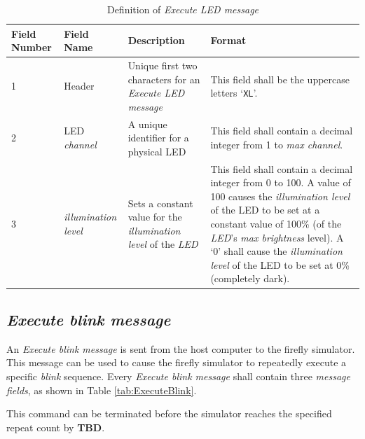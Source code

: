 \documentclass[letterpaper,11pt]{article}
\begin{document}
\begin{table}[H]
  \caption{Definition of \textit{Execute LED message}}
  \centering
  \setlength\extrarowheight{2pt}
  \begin{tabular}[h]{|p{0.5in}|p{1.00in}|p{2.25in}|p{2.25in}|} \hline
    Field Number & Field Name & Description & Format \\ \hline
    1            & Header
                 & Unique first two characters for an \textit{Execute LED
                 message}
                 & This field shall be the uppercase letters `\texttt{XL}'.
                 \\ \hline
    2            & LED \textit{channel}
                 & A unique identifier for a physical LED
                 & This field shall contain a decimal integer from 1 to
                 \textit{max channel}.
                 \\ \hline
    3            & \textit{illumination level}
                 & Sets a constant value for the \textit{illumination level}
                 of the \textit{LED}
                 & This field shall contain a decimal integer from 0 to 100.
                 A value of 100 causes the \textit{illumination level} of the
                 LED to be set at a constant value of 100\% (of the
                 \textit{LED}'s \textit{max brightness} level). A `0' shall
                 cause the \textit{illumination level} of the LED to be set at
                 0\% (completely dark).
                 \\ \hline
  \end{tabular}
  \label{tab:ExecuteLED}
\end{table}

\subsection{\textit{Execute blink message}}

An \textit{Execute blink message} is sent from the host computer to the
firefly simulator. This message can be used to cause the firefly simulator to
repeatedly execute a specific \textit{blink} sequence. Every \textit{Execute
blink message} shall contain three \textit{message fields}, as shown in Table
\ref{tab:ExecuteBlink}.

This command can be terminated before the simulator reaches the specified
repeat count by \textbf{TBD}.
\end{document}
